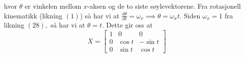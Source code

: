 hvor $\theta$ er vinkelen mellom $x$-aksen og de to siste søylevektorene. Fra rotasjonell kinematikk (likning $(1)$) så har vi at $\frac{d\theta}{dt}=\omega_x\implies\theta=\omega_xt.$ Siden $\omega_x=1$ fra likning $(28),$ så har vi at $\theta=t.$ Dette gir oss at 
\begin{equation}
    X=\begin{bmatrix}1&0&0\\0&\cos t&-\sin t\\0&\sin t&\cos t\end{bmatrix}
\end{equation}